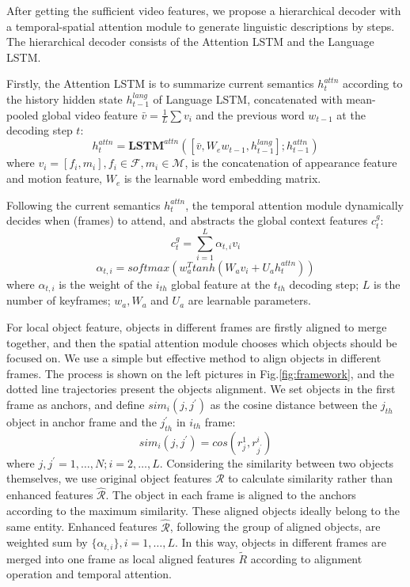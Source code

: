 \documentclass[10pt,twocolumn,letterpaper]{article}
\begin{document}
After getting the sufficient video features, we propose a hierarchical decoder with a temporal-spatial attention module to generate linguistic descriptions by steps. The hierarchical decoder consists of the Attention LSTM and the Language LSTM. 

Firstly, the Attention LSTM is to summarize current semantics $h_t^{attn}$ according to the history hidden state $h_{t-1}^{lang}$ of Language LSTM, concatenated with mean-pooled global video feature $\bar{v}=\frac{1}{L}\sum v_i$ and the previous word $w_{t-1}$ at the decoding step $t$:
\begin{equation}\label{key}
h_t^{attn} = \textbf{LSTM}^{attn}\left(\left[ \bar{v}, W_ew_{t-1},  h_{t-1}^{lang}\right] ; h_{t-1}^{attn} \right)
\end{equation}
where $v_i = [f_i,m_i],f_i \in \mathcal{F},m_i \in \mathcal{M} $, is the concatenation of appearance feature and motion feature, $W_e$ is the learnable word embedding matrix. 

Following the current semantics $h_t^{attn}$, the temporal attention module dynamically decides when (frames) to attend, and abstracts the global context features $c_t^g$:
\[ c_t^g = \sum_{i=1}^{L}{\alpha_{t,i}v_i} \]
\begin{equation}\label{key}
\alpha_{t,i} = softmax\left( w_a^T tanh\left( W_av_i + U_ah_t^{attn}\right)\right)
\end{equation}
where $\alpha_{t,i}$ is the weight of the $i_{th}$ global feature at the $t_{th}$ decoding step; $L$ is the number of keyframes; $w_a,W_a$ and $U_a$ are learnable parameters.

For local object feature, objects in different frames are firstly aligned to merge together, and then the spatial attention module chooses which objects should be focused on. We use a simple but effective method to align objects in different frames. The process is shown on the left pictures in Fig.\ref{fig:framework}, and the dotted line trajectories present the objects alignment. We set objects in the first frame as anchors, and define $sim_i(j,j^{'})$ as the cosine distance between the $j_{th}$ object in anchor frame and the $j_{th}^{'}$ in $i_{th}$ frame:
\begin{equation}\label{key}
sim_i\left(j,j^{'}\right)  = cos\left( r_j^{1}, r_{j^{'}}^{i}\right)
\end{equation}
where $j,j^{'}=1,\dots,N;i=2,\dots,L$. Considering the similarity between two objects themselves, we use original object features $\mathcal{R}$ to calculate similarity rather than enhanced features $\hat{\mathcal{R}}$. The object in each frame is aligned to the anchors according to the maximum similarity. These aligned objects ideally belong to the same entity. Enhanced features $\hat{\mathcal{R}}$, following the group of aligned objects, are weighted sum by $\{\alpha_{t,i}\},i=1,\dots,L$. In this way, objects in different frames are merged into one frame as local aligned features $\tilde{R}$ according to alignment operation and temporal attention.
\end{document}

